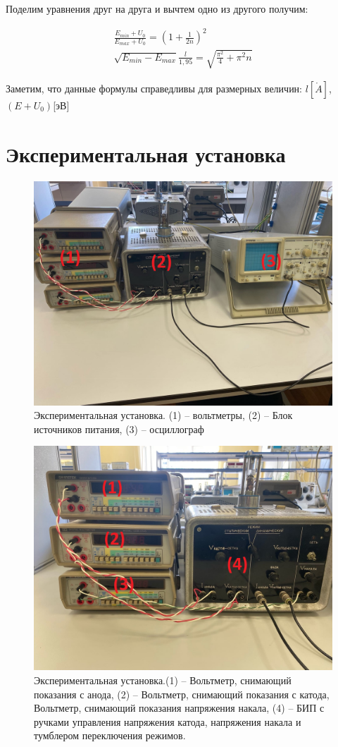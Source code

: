 \documentclass[a4paper,12pt]{article}
\begin{document}
Поделим уравнения друг на друга и вычтем одно из другого получим:

\begin{align} 
	\frac{E_{min} + U_0}{E_{max} + U_0} = \left(1 + \frac{1}{2n} \right)^2  \label{eq5:to_find_U} \\
	\sqrt{E_{min} - E_{max}} \frac{l}{1,95} = \sqrt{ \frac{\pi^2}{4} + \pi^2 n} \label{eq6:to_find_l}
\end{align}

Заметим, что данные формулы справедливы для размерных величин: $l[\mathring{A}]$, $(E + U_0)$[эВ]

\newpage

\section*{Экспериментальная установка}
\begin{figure}[h]
	\centering
	\includegraphics[width=0.7\linewidth]{fig4}
	\caption{Экспериментальная установка. (1) -- вольтметры, (2) -- Блок источников питания, (3) -- осциллограф}
\end{figure}

\begin{figure}[h!]
	\centering
	\includegraphics[width=0.7\linewidth]{fig5}
	\caption{Экспериментальная установка.(1) -- Вольтметр, снимающий показания с анода, (2) -- Вольтметр, снимающий показания с катода, Вольтметр, снимающий показания напряжения накала, (4) -- БИП с ручками управления напряжения катода, напряжения накала и тумблером переключения режимов.}
\end{figure}
\end{document}
